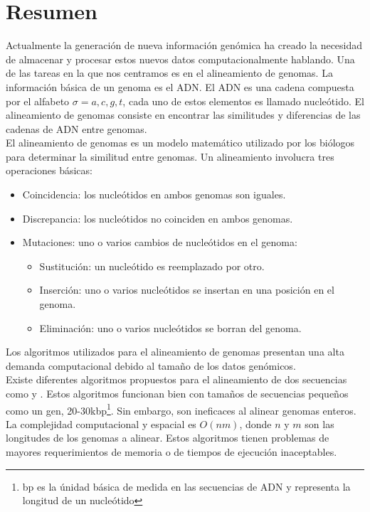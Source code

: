 \documentclass[12pt,a4paper]{article}
\begin{document}
\section{Resumen}
\indent
Actualmente la generación de nueva información genómica ha creado la necesidad de almacenar y procesar estos nuevos datos computacionalmente hablando. Una de las tareas en la que nos centramos es en el alineamiento de genomas. La información básica de un genoma es el ADN. El ADN es una cadena compuesta por el alfabeto $\sigma={a,c,g,t}$, cada uno de estos elementos es llamado nucleótido. El alineamiento de genomas consiste en encontrar las similitudes y diferencias de las cadenas de ADN entre genomas.\\
El alineamiento de genomas es un modelo matemático utilizado por los biólogos para determinar la similitud entre genomas. Un alineamiento involucra tres operaciones básicas:
\begin{itemize}
  \item Coincidencia: los nucleótidos en ambos genomas son iguales.
  \item Discrepancia: los nucleótidos no coinciden en ambos genomas.
  \item Mutaciones: uno o varios cambios de nucleótidos en el genoma:
    \begin{itemize}
      \item Sustitución: un nucleótido es reemplazado por otro.
      \item Inserción: uno o varios nucleótidos se insertan en una posición en el genoma.
      \item Eliminación: uno o varios nucleótidos se borran del genoma.
    \end{itemize}
\end{itemize}
Los algoritmos utilizados para el alineamiento de genomas presentan una alta demanda computacional debido al tamaño de los datos genómicos.\\
\indent
Existe diferentes algoritmos propuestos para el alineamiento de dos secuencias como \cite{Needleman1970General} y \cite{Waterman}. Estos algoritmos funcionan bien con tamaños de secuencias pequeños como un gen, 20-30kbp\footnote{bp es la únidad básica de medida en las secuencias de ADN y representa la longitud de un nucleótido}. Sin embargo, son ineficaces al alinear genomas enteros. La complejidad computacional y espacial es $O(nm)$, donde $n$ y $m$ son las longitudes de los genomas a alinear. Estos algoritmos tienen problemas de mayores requerimientos de memoria o de tiempos de ejecución inaceptables.\\
\end{document}
